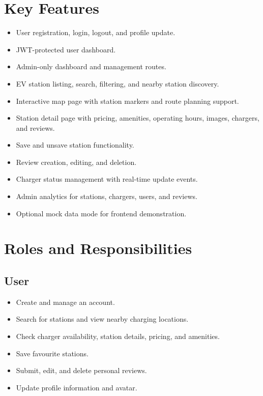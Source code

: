 \documentclass[12pt,a4paper]{article}
\begin{document}
\section{Key Features}

\begin{itemize}
  \item User registration, login, logout, and profile update.
  \item JWT-protected user dashboard.
  \item Admin-only dashboard and management routes.
  \item EV station listing, search, filtering, and nearby station discovery.
  \item Interactive map page with station markers and route planning support.
  \item Station detail page with pricing, amenities, operating hours, images, chargers, and reviews.
  \item Save and unsave station functionality.
  \item Review creation, editing, and deletion.
  \item Charger status management with real-time update events.
  \item Admin analytics for stations, chargers, users, and reviews.
  \item Optional mock data mode for frontend demonstration.
\end{itemize}

\section{Roles and Responsibilities}

\subsection{User}

\begin{itemize}
  \item Create and manage an account.
  \item Search for stations and view nearby charging locations.
  \item Check charger availability, station details, pricing, and amenities.
  \item Save favourite stations.
  \item Submit, edit, and delete personal reviews.
  \item Update profile information and avatar.
\end{itemize}
\end{document}
